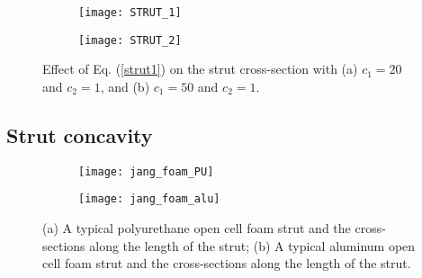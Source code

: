 \begin{figure}
	\centering
	\begin{subfigure}[b]{0.49\textwidth}
		\texttt{[image: STRUT\_1]}
		\caption{}
	\end{subfigure}
	\begin{subfigure}[b]{0.49\textwidth}
		\texttt{[image: STRUT\_2]}
		\caption{}
	\end{subfigure}

	\caption{Effect of Eq. (\ref{strut1}) on the strut cross-section with (a) $ c_1=20 $ and $ c_2 = 1 $, and (b) $c_1=50  $ and $ c_2=1 $.}\label{strut5}
\end{figure}

\subsection{Strut concavity}\label{of-feature-strutcon}

\begin{figure}
	\centering
	\begin{subfigure}[b]{0.45\textwidth}
		\texttt{[image: jang\_foam\_PU]}
		\caption{}
	\end{subfigure}
	\begin{subfigure}[b]{0.45\textwidth}
	\texttt{[image: jang\_foam\_alu]}
	\caption{}
\end{subfigure}
	\caption{(a) A typical polyurethane open cell foam strut and the cross-sections along the length of the strut\cite{gongCompressiveResponseOpencell2005}; (b) A typical aluminum open cell foam strut and the cross-sections along the length of the strut\cite{jangCrushingAluminumOpencell2009}.}\label{strut3}
\end{figure}

